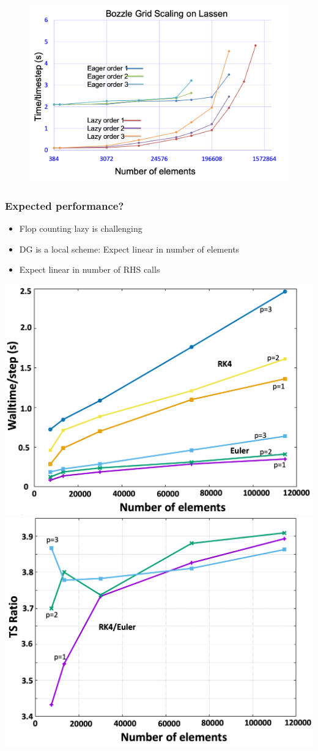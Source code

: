 \begin{frame}
\begin{minipage}{0.5\textwidth}
\begin{figure}
      \includegraphics[width=\textwidth]{figures/bozzle_gridscale.png}
    \end{figure}		
  \end{minipage}
\end{frame}

\begin{frame}\frametitle{Expected performance?}
\begin{itemize}
\item Flop counting lazy is challenging
\item DG is a local scheme: Expect linear in number of elements
\item Expect linear in number of RHS calls
\end{itemize}
\includegraphics[width=.45\textwidth]{figures/TSCompare.png}
\includegraphics[width=.45\textwidth]{figures/TSRatio.png}
\end{frame}

